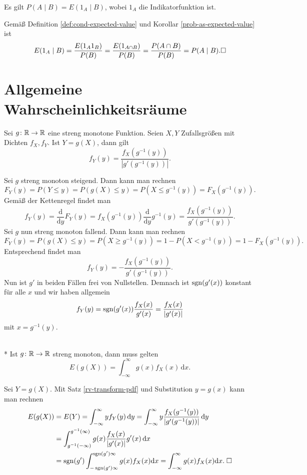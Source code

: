 \begin{Korollar}
Es gilt $P(A\mid B) = E(1_A\mid B)$, wobei $1_A$ die Indikatorfunktion ist.
\end{Korollar}
 Gemäß Definition \ref{def:cond-expected-value}
und Korollar \ref{prob-as-expected-value} ist
\[E(1_A\mid B) = \frac{E(1_A 1_B)}{P(B)} = \frac{E(1_{A\cap B})}{P(B)}
= \frac{P(A\cap B)}{P(B)} = P(A\mid B).\square\]

\section{Allgemeine Wahrscheinlichkeitsräume}

\begin{Satz}\label{rv-transform-pdf}
Sei $g\colon\mathbb R\to\mathbb R$ eine streng monotone Funktion. Seien
$X,Y$ Zufallsgrößen mit Dichten $f_X,f_Y$. Ist $Y=g(X)$,
dann gilt
\[f_Y(y) = \frac{f_X(g^{-1}(y))}{|g'(g^{-1}(y))|}.\]
\end{Satz}
 Sei $g$ streng monoton steigend. Dann kann man rechnen
\[F_Y(y) = P(Y\le y) = P(g(X)\le y) = P(X\le g^{-1}(y)) = F_X(g^{-1}(y)).\]
Gemäß der Kettenregel findet man
\[f_Y(y) = \frac{\mathrm d}{\mathrm dy}F_Y(y)
= f_X(g^{-1}(y))\frac{\mathrm d}{\mathrm dy}g^{-1}(y) = \frac{f_X(g^{-1}(y))}{g'(g^{-1}(y))}.\]
Sei $g$ nun streng monoton fallend. Dann kann man rechnen
\[F_Y(y) = P(g(X)\le y) = P(X\ge g^{-1}(y)) = 1 - P(X < g^{-1}(y))
= 1 - F_X(g^{-1}(y)).\]
Entsprechend findet man
\[f_Y(y) = -\frac{f_X(g^{-1}(y))}{g'(g^{-1}(y))}.\]
Nun ist $g'$ in beiden Fällen frei von Nullstellen. Demnach ist
$\operatorname{sgn}(g'(x))$ konstant für alle $x$ und wir haben allgemein
\[f_Y(y) = \operatorname{sgn}(g'(x))\frac{f_X(x)}{g'(x)} = \frac{f_X(x)}{|g'(x)|}\]
mit $x=g^{-1}(y)$.\;\qedsymbol

\begin{Satz}\mbox{}\\*
Ist $g\colon\mathbb R\to\mathbb R$ streng monoton, dann muss gelten
\[E(g(X)) = \int_{-\infty}^\infty g(x)f_X(x)\,\mathrm dx.\]
\end{Satz}
 Sei $Y=g(X)$. Mit Satz \ref{rv-transform-pdf}
und Substitution $y=g(x)$ kann man rechnen
\begin{align*}
E(g(X)) &= E(Y) = \int_{-\infty}^\infty yf_Y(y)\,\mathrm dy
= \int_{-\infty}^\infty y\frac{f_X(g^{-1}(y))}{|g'(g^{-1}(y))|}\,\mathrm dy\\
&= \int_{g^{-1}(-\infty)}^{g^{-1}(\infty)} g(x)
\frac{f_X(x)}{|g'(x)|}g'(x)\,\mathrm dx\\
&= \operatorname{sgn}(g')\int_{-\operatorname{sgn}(g')\infty}^{\operatorname{sgn}(g')\infty}g(x) f_X(x)\mathrm dx
= \int_{-\infty}^\infty g(x) f_X(x)\mathrm dx.\;\square
\end{align*}

